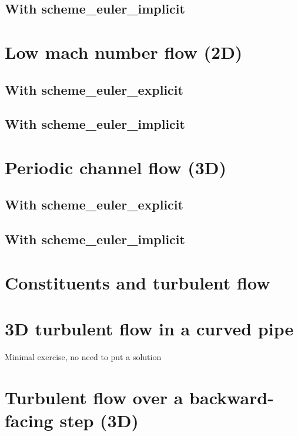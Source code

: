\documentclass[english]{article}
\begin{document}
\subsection{With scheme\_euler\_implicit}


\section{Low mach number flow (2D)}
\subsection{With scheme\_euler\_explicit}

\subsection{With scheme\_euler\_implicit}


\section{Periodic channel flow (3D)}
\subsection{With scheme\_euler\_explicit}

\subsection{With scheme\_euler\_implicit}


\section{Constituents and turbulent flow}


\section{3D turbulent flow in a curved pipe}
Minimal exercise, no need to put a solution

\section{Turbulent flow over a backward-facing step (3D)}
\end{document}
